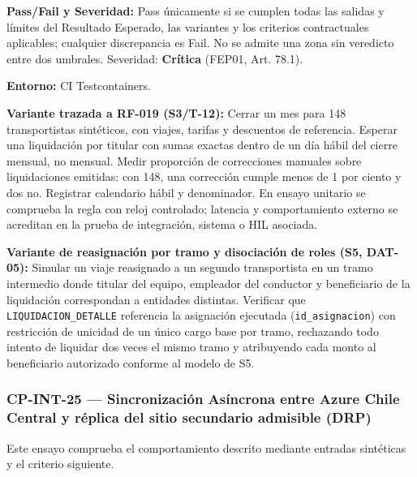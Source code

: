\par\noindent\textbf{Pass/Fail y Severidad:} Pass únicamente si se cumplen todas las salidas y límites del Resultado Esperado, las variantes y los criterios contractuales aplicables; cualquier discrepancia es Fail. No se admite una zona sin veredicto entre dos umbrales. Severidad: \textbf{Crítica} (FEP01, Art. 78.1).\par
\par\noindent\textbf{Entorno:} CI Testcontainers.\par







\par\noindent\textbf{Variante trazada a RF-019 (S3/T-12):} Cerrar un mes para 148 transportistas sintéticos, con viajes, tarifas y descuentos de referencia. Esperar una liquidación por titular con sumas exactas dentro de un día hábil del cierre mensual, no mensual. Medir proporción de correcciones manuales sobre liquidaciones emitidas: con 148, una corrección cumple menos de 1 por ciento y dos no. Registrar calendario hábil y denominador. En ensayo unitario se comprueba la regla con reloj controlado; latencia y comportamiento externo se acreditan en la prueba de integración, sistema o HIL asociada.\par

\par\noindent\textbf{Variante de reasignación por tramo y disociación de roles (S5, DAT-05):} Simular un viaje reasignado a un segundo transportista en un tramo intermedio donde titular del equipo, empleador del conductor y beneficiario de la liquidación correspondan a entidades distintas. Verificar que \texttt{LIQUIDACION\_DETALLE} referencia la asignación ejecutada (\texttt{id\_asignacion}) con restricción de unicidad de un único cargo base por tramo, rechazando todo intento de liquidar dos veces el mismo tramo y atribuyendo cada monto al beneficiario autorizado conforme al modelo de S5.\par
\subsubsection*{CP-INT-25 — Sincronización Asíncrona entre Azure Chile Central y réplica del sitio secundario admisible (DRP)}\label{sec:9-cp-int-25}
Este ensayo comprueba el comportamiento descrito mediante entradas sintéticas y el criterio siguiente.

